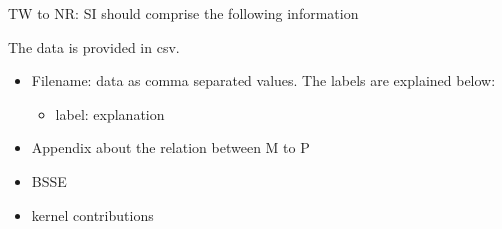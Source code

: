 \documentclass[journal=jctcce,manuscript=article]{achemso}
\begin{document}
\begin{suppinfo}
{\color{red} TW to NR: 
SI should comprise the following information

The data is provided in csv.
\begin{itemize}
  \item Filename: data as comma separated values. The labels are explained below:
  \begin{itemize}
   \item label: explanation
  \end{itemize}
  \item Appendix about the relation between M to P
  \item BSSE
  \item kernel contributions
\end{itemize}
}
\end{suppinfo}




\end{document}
